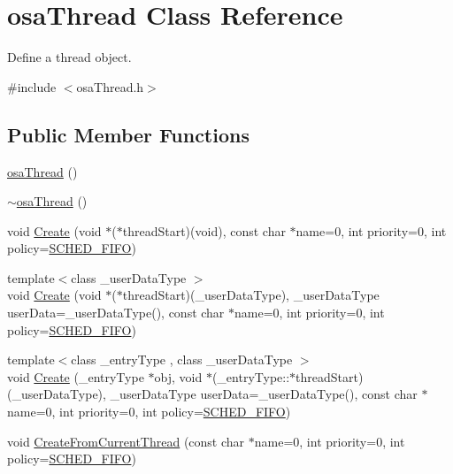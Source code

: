 \hypertarget{classosa_thread}{\section{osa\-Thread Class Reference}
\label{classosa_thread}
}


Define a thread object.  




{\ttfamily \#include $<$osa\-Thread.\-h$>$}

\subsection*{Public Member Functions}
\begin{DoxyCompactItemize}
\item 
\hyperlink{classosa_thread_a07af4cb616252c49d88fe4af1c4dff0d}{osa\-Thread} ()
\item 
\hyperlink{classosa_thread_ac3ecb3d70e403a025136b1b7b7512339}{$\sim$osa\-Thread} ()
\item 
void \hyperlink{classosa_thread_acc044c7a382f6909d73464ee96654e9c}{Create} (void $\ast$($\ast$thread\-Start)(void), const char $\ast$name=0, int priority=0, int policy=\hyperlink{osa_thread_8h_ab998332c6538a029b4eed398b7a423da}{S\-C\-H\-E\-D\-\_\-\-F\-I\-F\-O})
\item 
{\footnotesize template$<$class \-\_\-user\-Data\-Type $>$ }\\void \hyperlink{classosa_thread_a8d4e564d8693fd3d58f2bf3c51e6ea2f}{Create} (void $\ast$($\ast$thread\-Start)(\-\_\-user\-Data\-Type), \-\_\-user\-Data\-Type user\-Data=\-\_\-user\-Data\-Type(), const char $\ast$name=0, int priority=0, int policy=\hyperlink{osa_thread_8h_ab998332c6538a029b4eed398b7a423da}{S\-C\-H\-E\-D\-\_\-\-F\-I\-F\-O})
\item 
{\footnotesize template$<$class \-\_\-entry\-Type , class \-\_\-user\-Data\-Type $>$ }\\void \hyperlink{classosa_thread_a474ad4e267aacae8de7ee014a225dacf}{Create} (\-\_\-entry\-Type $\ast$obj, void $\ast$(\-\_\-entry\-Type\-::$\ast$thread\-Start)(\-\_\-user\-Data\-Type), \-\_\-user\-Data\-Type user\-Data=\-\_\-user\-Data\-Type(), const char $\ast$name=0, int priority=0, int policy=\hyperlink{osa_thread_8h_ab998332c6538a029b4eed398b7a423da}{S\-C\-H\-E\-D\-\_\-\-F\-I\-F\-O})
\item 
void \hyperlink{classosa_thread_aa3e4a3f768b9642be4b3efa33ec4ab48}{Create\-From\-Current\-Thread} (const char $\ast$name=0, int priority=0, int policy=\hyperlink{osa_thread_8h_ab998332c6538a029b4eed398b7a423da}{S\-C\-H\-E\-D\-\_\-\-F\-I\-F\-O})

\end{DoxyCompactItemize}
